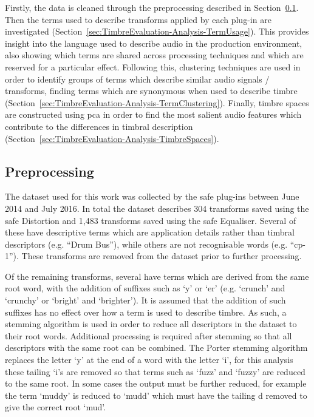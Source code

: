 	Firstly, the data is cleaned through the preprocessing described in
	Section~\ref{sec:TimbreEvaluation-Analysis-Preprocessing}. Then the terms used to describe transforms applied by
	each plug-in are investigated (Section~\ref{sec:TimbreEvaluation-Analysis-TermUsage}). This provides insight into
	the language used to describe audio in the production environment, also showing which terms are shared across
	processing techniques and which are reserved for a particular effect. Following this, clustering techniques are
	used in order to identify groups of terms which describe similar audio signals / transforms, finding terms which
	are synonymous when used to describe timbre (Section~\ref{sec:TimbreEvaluation-Analysis-TermClustering}). Finally,
	timbre spaces are constructed using \acrshort{pca} in order to find the most salient audio features which
	contribute to the differences in timbral description (Section~\ref{sec:TimbreEvaluation-Analysis-TimbreSpaces}).

	\subsection{Preprocessing}
	\label{sec:TimbreEvaluation-Analysis-Preprocessing}
		The dataset used for this work was collected by the \acrshort{safe} plug-ins between June 2014 and July
		2016. In total the dataset describes 304 transforms saved using the \acrshort{safe} Distortion and 1,483
		transforms saved using the \acrshort{safe} Equaliser. Several of these have descriptive terms which are
		application details rather than timbral descriptors (e.g. ``Drum Bus''), while others are not recognisable
		words (e.g.  ``cp-1''). These transforms are removed from the dataset prior to further processing.

		Of the remaining transforms, several have terms which are derived from the same root word, with the
		addition of suffixes such as `y' or `er' (e.g. `crunch' and `crunchy' or `bright' and `brighter'). It is
		assumed that the addition of such suffixes has no effect over how a term is used to describe timbre. As
		such, a stemming algorithm \citep{porter1980an} is used in order to reduce all descriptors in the dataset
		to their root words.  Additional processing is required after stemming so that all descriptors with the
		same root can be combined.  The Porter stemming algorithm replaces the letter `y' at the end of a word with
		the letter `i', for this analysis these tailing `i's are removed so that terms such as `fuzz' and `fuzzy'
		are reduced to the same root. In some cases the output must be further reduced, for example the term
		`muddy' is reduced to `mudd' which must have the tailing d removed to give the correct root `mud'.

